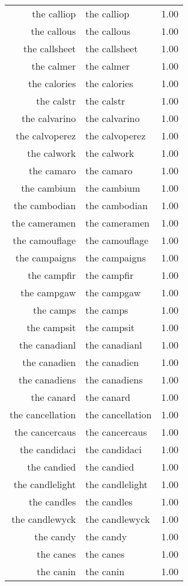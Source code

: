 \begin{table}[ht]
\begin{tabular}{rlr}
  the calliop & the calliop & 1.00 \\ 
  the callous & the callous & 1.00 \\ 
  the callsheet & the callsheet & 1.00 \\ 
  the calmer & the calmer & 1.00 \\ 
  the calories & the calories & 1.00 \\ 
  the calstr & the calstr & 1.00 \\ 
  the calvarino & the calvarino & 1.00 \\ 
  the calvoperez & the calvoperez & 1.00 \\ 
  the calwork & the calwork & 1.00 \\ 
  the camaro & the camaro & 1.00 \\ 
  the cambium & the cambium & 1.00 \\ 
  the cambodian & the cambodian & 1.00 \\ 
  the cameramen & the cameramen & 1.00 \\ 
  the camouflage & the camouflage & 1.00 \\ 
  the campaigns & the campaigns & 1.00 \\ 
  the campfir & the campfir & 1.00 \\ 
  the campgaw & the campgaw & 1.00 \\ 
  the camps & the camps & 1.00 \\ 
  the campsit & the campsit & 1.00 \\ 
  the canadianl & the canadianl & 1.00 \\ 
  the canadien & the canadien & 1.00 \\ 
  the canadiens & the canadiens & 1.00 \\ 
  the canard & the canard & 1.00 \\ 
  the cancellation & the cancellation & 1.00 \\ 
  the cancercaus & the cancercaus & 1.00 \\ 
  the candidaci & the candidaci & 1.00 \\ 
  the candied & the candied & 1.00 \\ 
  the candlelight & the candlelight & 1.00 \\ 
  the candles & the candles & 1.00 \\ 
  the candlewyck & the candlewyck & 1.00 \\ 
  the candy & the candy & 1.00 \\ 
  the canes & the canes & 1.00 \\ 
  the canin & the canin & 1.00 \\ 

\end{tabular}
\end{table}
